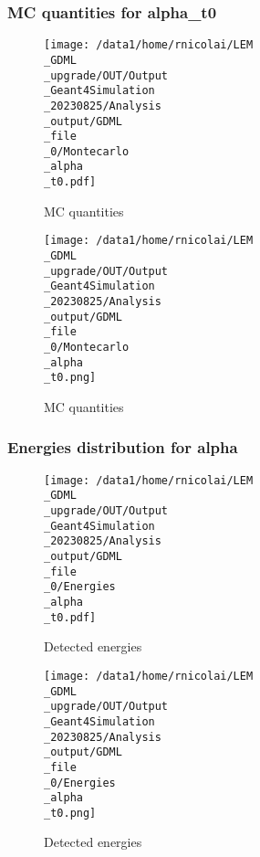 \documentclass[8pt]{beamer}
\begin{document}
            \begin{frame}
                \frametitle{MC quantities for alpha\_t0}
            
        \begin{figure}[h]
            \centering
            \texttt{[image: /data1/home/rnicolai/LEM\\\_GDML\\\_upgrade/OUT/Output\\\_Geant4Simulation\\\_20230825/Analysis\\\_output/GDML\\\_file\\\_0/Montecarlo\\\_alpha\\\_t0.pdf]}
            \caption{MC quantities}
        \end{figure}
        
        \begin{figure}[h]
            \centering
            \texttt{[image: /data1/home/rnicolai/LEM\\\_GDML\\\_upgrade/OUT/Output\\\_Geant4Simulation\\\_20230825/Analysis\\\_output/GDML\\\_file\\\_0/Montecarlo\\\_alpha\\\_t0.png]}
            \caption{MC quantities}
        \end{figure}
        
            \end{frame}
            
            \begin{frame}
                \frametitle{Energies distribution for alpha}
            
        \begin{figure}[h]
            \centering
            \texttt{[image: /data1/home/rnicolai/LEM\\\_GDML\\\_upgrade/OUT/Output\\\_Geant4Simulation\\\_20230825/Analysis\\\_output/GDML\\\_file\\\_0/Energies\\\_alpha\\\_t0.pdf]}
            \caption{Detected energies}
        \end{figure}
        
        \begin{figure}[h]
            \centering
            \texttt{[image: /data1/home/rnicolai/LEM\\\_GDML\\\_upgrade/OUT/Output\\\_Geant4Simulation\\\_20230825/Analysis\\\_output/GDML\\\_file\\\_0/Energies\\\_alpha\\\_t0.png]}
            \caption{Detected energies}
        \end{figure}
        
            \end{frame}
            
\end{document}
